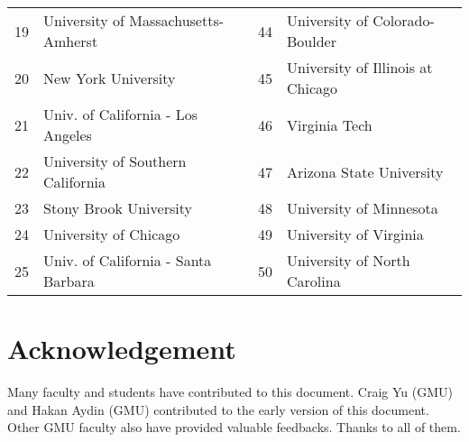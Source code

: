 \documentclass[11pt]{article}
\begin{document}
\begin{table}[h!]
\begin{tabular}{rl|rl}
    19 & University of Massachusetts-Amherst & 44&  University of Colorado-Boulder \\
    20 &  New York University  &45& University of Illinois at Chicago  \\
    21 & Univ. of California - Los Angeles &46& Virginia Tech  \\
    22 & University of Southern California &47&  Arizona State University \\
    23 & Stony Brook University &48&University of Minnesota \\
    24 & University of Chicago &49& University of Virginia \\
    25 & Univ. of California - Santa Barbara &50& University of North Carolina \\
    \bottomrule
    \end{tabular}
\end{table}

\section{Acknowledgement}
Many faculty and students have contributed to this document.
Craig Yu (GMU) and Hakan Aydin (GMU) contributed to the early version of this document. Other GMU faculty also have provided valuable feedbacks.  Thanks to all of them.


\newpage
\end{document}
